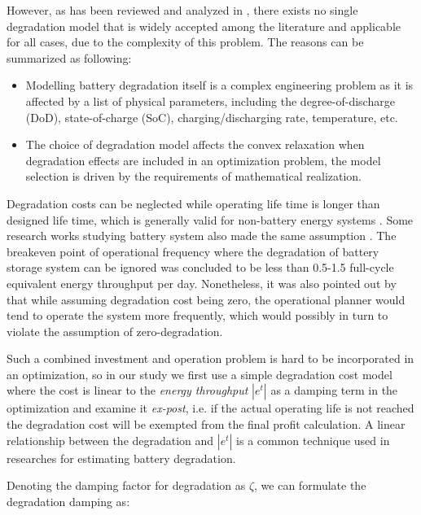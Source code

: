 However, as has been reviewed and analyzed in \cite{Megel2017}, there exists no single degradation model that is widely accepted among the literature and applicable for all cases, due to the complexity of this problem. The reasons can be summarized as following:
\begin{itemize}
	\item Modelling battery degradation itself is a complex engineering problem as it is affected by a list of physical parameters, including the degree-of-discharge (DoD), state-of-charge (SoC), charging/discharging rate, temperature, etc.\cite{Barre2013}
	\item The choice of degradation model affects the convex relaxation when degradation effects are included in an optimization problem, the model selection is driven by the requirements of mathematical realization. \cite{Megel2017}
\end{itemize}

Degradation costs can be neglected while operating life time is longer than designed life time, which is generally valid for non-battery energy systems \cite{Bradbury2014}\cite{Zafirakis2016}\cite{Connolly2011}. Some research works studying battery system also made the same assumption  \cite{Byrne2012}\cite{McConnell2015}\cite{Sioshansi2009}. The breakeven point of operational frequency where the degradation of battery storage system can be ignored was concluded to be less than 0.5-1.5 full-cycle equivalent energy throughput per day\cite{Megel2017}. Nonetheless, it was also pointed out by \cite{Megel2017} that while assuming degradation cost being zero, the operational planner would tend to operate the system more frequently, which would possibly in turn to violate the assumption of zero-degradation.

Such a combined investment and operation problem is hard to be incorporated in an optimization, so in our study we first use a simple degradation cost model where the cost is linear to the \textit{energy throughput} $|e^t|$ as a damping term in the optimization and examine it \textit{ex-post}, i.e. if the actual operating life is not reached the degradation cost will be exempted from the final profit calculation. A linear relationship between the degradation and $|e^t|$ is a common technique used in researches for estimating battery degradation\cite{Byrne2012}\cite{Berrada2016}.

Denoting the damping factor for degradation as $\zeta$, we can formulate the degradation damping as:

